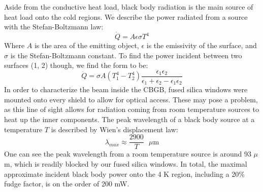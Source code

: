 Aside from the conductive heat load, black body radiation is the main source of heat load onto the cold regions. We describe the power radiated from a source with the Stefan-Boltzmann law:
\begin{equation}
	\dot{Q} = A \epsilon \sigma T^4
\end{equation}
Where $A$ is the area of the emitting object, $\epsilon$ is the emissivity of the surface, and $\sigma$ is the Stefan-Boltzmann constant. To find the power incident between two surfaces (1, 2) though, we find the form to be:\cite{Behrens1997}
\begin{equation}
	\dot{Q} = \sigma A (T_1^4 - T_2^4)\frac{\epsilon_1 \epsilon_2}{\epsilon_1 + \epsilon_2 - \epsilon_1 \epsilon_2}
\end{equation}
In order to characterize the beam inside the CBGB, fused silica windows were mounted onto every shield to allow for optical access. These may pose a problem, as this line of sight allows for radiation coming from room temperature sources to heat up the inner components. The peak wavelength of a black body source at a temperature $T$ is described by Wien's displacement law:
\begin{equation}
	\lambda_{max} \approx \frac{2900}{T}\text{ $\mu$m}
	\label{eq: BBR peak lambda}
\end{equation}
One can see the peak wavelength from a room temperature source is around 93 $\mu$m, which is readily blocked by our fused silica windows. In total, the maximal approximate incident black body power onto the 4 K region, including a 20\% fudge factor, is on the order of 200 mW.
